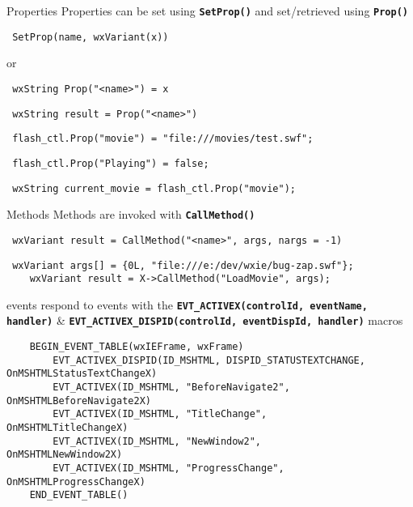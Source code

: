 \begin{Desc}
\item[Properties]Properties can be set using {\tt {\bf Set\-Prop()}}  and set/retrieved using {\tt {\bf Prop()}}  

\footnotesize\begin{verbatim} SetProp(name, wxVariant(x)) 
\end{verbatim}\normalsize
or 

\footnotesize\begin{verbatim} wxString Prop("<name>") = x
\end{verbatim}\normalsize


\footnotesize\begin{verbatim} wxString result = Prop("<name>")
\end{verbatim}\normalsize


\footnotesize\begin{verbatim} flash_ctl.Prop("movie") = "file:///movies/test.swf";
\end{verbatim}\normalsize


\footnotesize\begin{verbatim} flash_ctl.Prop("Playing") = false;
\end{verbatim}\normalsize


\footnotesize\begin{verbatim} wxString current_movie = flash_ctl.Prop("movie");
\end{verbatim}\normalsize
\end{Desc}
\begin{Desc}
\item[Methods]Methods are invoked with {\tt {\bf Call\-Method()}}  

\footnotesize\begin{verbatim} wxVariant result = CallMethod("<name>", args, nargs = -1)
\end{verbatim}\normalsize


\footnotesize\begin{verbatim} wxVariant args[] = {0L, "file:///e:/dev/wxie/bug-zap.swf"};
    wxVariant result = X->CallMethod("LoadMovie", args);
\end{verbatim}\normalsize
\end{Desc}
\begin{Desc}
\item[events]respond to events with the {\tt {\bf EVT\_\-ACTIVEX(control\-Id, event\-Name, handler)}}  \& {\tt {\bf EVT\_\-ACTIVEX\_\-DISPID(control\-Id, event\-Disp\-Id, handler)}}  macros 

\footnotesize\begin{verbatim}
    BEGIN_EVENT_TABLE(wxIEFrame, wxFrame)
        EVT_ACTIVEX_DISPID(ID_MSHTML, DISPID_STATUSTEXTCHANGE,  OnMSHTMLStatusTextChangeX)
        EVT_ACTIVEX(ID_MSHTML, "BeforeNavigate2",   OnMSHTMLBeforeNavigate2X)
        EVT_ACTIVEX(ID_MSHTML, "TitleChange",       OnMSHTMLTitleChangeX)
        EVT_ACTIVEX(ID_MSHTML, "NewWindow2",        OnMSHTMLNewWindow2X)
        EVT_ACTIVEX(ID_MSHTML, "ProgressChange",    OnMSHTMLProgressChangeX)
    END_EVENT_TABLE()
\end{verbatim}\normalsize
\end{Desc}




